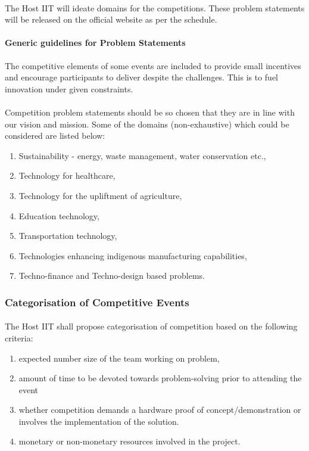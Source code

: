 \paragraph{}
The Host IIT will ideate domains for the competitions. These problem statements will be released on the official website as per the schedule. 

\paragraph{Generic guidelines for Problem Statements} 
The competitive elements of some events are included to provide small incentives and encourage participants to deliver despite the challenges. This is to fuel innovation under given constraints.

\paragraph{}
Competition problem statements should be so chosen that they are in line with our vision and mission. Some of the domains (non-exhaustive) which could be considered are listed below:

\begin{enumerate}
    \item Sustainability - energy, waste management, water conservation etc.,
    \item Technology for healthcare,
    \item Technology for the upliftment of agriculture,
    \item Education technology,
    \item Transportation technology,
    \item Technologies enhancing indigenous manufacturing capabilities,
    \item Techno-finance and Techno-design based problems.
\end{enumerate}

\subsubsection{Categorisation of Competitive Events}
\paragraph{}
The Host IIT shall propose categorisation of competition based on the following criteria:
\begin{enumerate}
    \item expected number size of the team working on problem,
    \item amount of time to be devoted towards problem-solving prior to attending the event
    \item whether competition demands a hardware proof of concept/demonstration or involves the implementation of the solution.
    \item monetary or non-monetary resources involved in the project.
\end{enumerate}

